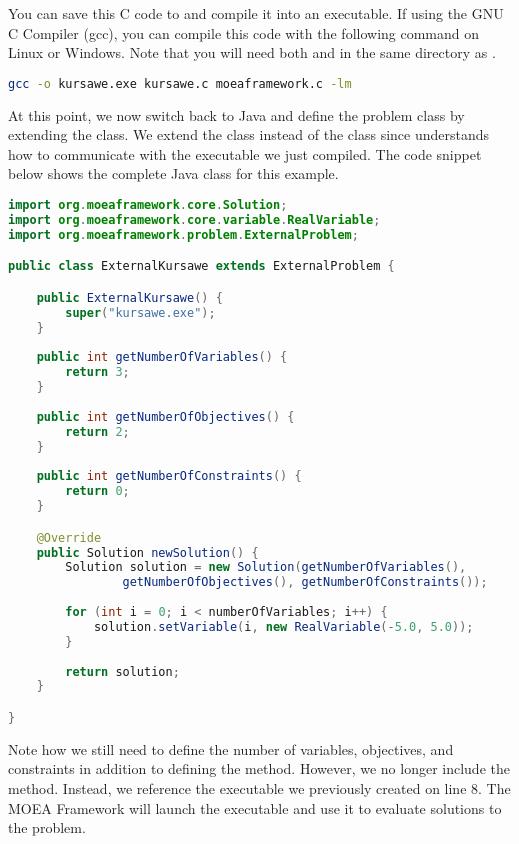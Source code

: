 You can save this C code to  and compile it into an executable.  If using the GNU C Compiler (gcc), you can compile this code with the following command on Linux or Windows.  Note that you will need both  and  in the same directory as .

\begin{lstlisting}[language=bash,breakatwhitespace=true]
gcc -o kursawe.exe kursawe.c moeaframework.c -lm
\end{lstlisting}

At this point, we now switch back to Java and define the problem class by extending the  class.  We extend the  class instead of the  class since  understands how to communicate with the executable we just compiled.  The code snippet below shows the complete Java class for this example.

\begin{lstlisting}[language=Java]
import org.moeaframework.core.Solution;
import org.moeaframework.core.variable.RealVariable;
import org.moeaframework.problem.ExternalProblem;

public class ExternalKursawe extends ExternalProblem {

	public ExternalKursawe() {
		super("kursawe.exe");
	}
	
	public int getNumberOfVariables() {
		return 3;
	}
	
	public int getNumberOfObjectives() {
		return 2;
	}
	
	public int getNumberOfConstraints() {
		return 0;
	}

	@Override
	public Solution newSolution() {
		Solution solution = new Solution(getNumberOfVariables(), 
				getNumberOfObjectives(), getNumberOfConstraints());
 
		for (int i = 0; i < numberOfVariables; i++) {
			solution.setVariable(i, new RealVariable(-5.0, 5.0));
		}
 
		return solution;
	}

}
\end{lstlisting}

Note how we still need to define the number of variables, objectives, and constraints in addition to defining the  method.  However, we no longer include the  method.  Instead, we reference the executable we previously created on line 8.  The MOEA Framework will launch the executable and use it to evaluate solutions to the problem.


